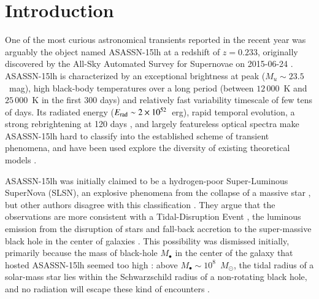 \documentclass[traditabstract]{aa}
\newcommand{\Msun}{$M_\odot$}
\begin{document}
\section{Introduction}
\label{sec:Intro}

One of the most curious astronomical transients reported in the recent year was arguably the object named ASASSN-15lh at a redshift of $z=0.233$, originally discovered by the All-Sky Automated Survey for Supernovae \citep[ASAS-SN][]{2014ApJ...788...48S} on 2015-06-24 \citep{2015ATel.7642....1N}. ASASSN-15lh is characterized by an exceptional brightness at peak ($M_u\sim23.5$~mag), high black-body temperatures over a long period (between $12\,000$~K and $25\,000$~K in the first 300 days) and relatively fast variability timescale of few tens of days. Its radiated energy ($E_{\rm rad}\sim2\times10^{52}$~erg), rapid temporal evolution, a strong rebrightening at 120 days \citep{2016ApJ...828....3B}, and largely featureless optical spectra \citep{2016Sci...351..257D, 2016NatAs...1E...2L} make ASASSN-15lh hard to classify into the established scheme of transient phenomena, and have been used explore the diversity of existing theoretical models \citep{2015MNRAS.454.3311M, 2016ApJ...817L...8B}.

ASASSN-15lh was initially claimed \citep[][]{2016Sci...351..257D, 2017MNRAS.466.1428G} to be a hydrogen-poor Super-Luminous SuperNova (SLSN), an explosive phenomena from the collapse of a massive star \citep{2011Natur.474..487Q}, but other authors disagree with this classification \citep{2016NatAs...1E...2L,  2017ApJ...836...25M}. They argue that the observations are more consistent with a Tidal-Disruption Event \citep[TDEs, e.g.,][]{2015JHEAp...7..148K}, the luminous emission from the disruption of stars and fall-back accretion to the super-massive black hole in the center of galaxies \citep{1988Natur.333..523R, 1989ApJ...346L..13E}. This possibility was dismissed initially, primarily because the mass of black-hole $M_\bullet$ in the center of the galaxy that hosted ASASSN-15lh seemed too high \citep{2015ATel.7776....1P}: above $M_\bullet\sim10^{8}$~\Msun, the tidal radius of a solar-mass star lies within the Schwarzschild radius of a non-rotating black hole, and no radiation will escape these kind of encounters \citep{1975Natur.254..295H}.
\end{document}
